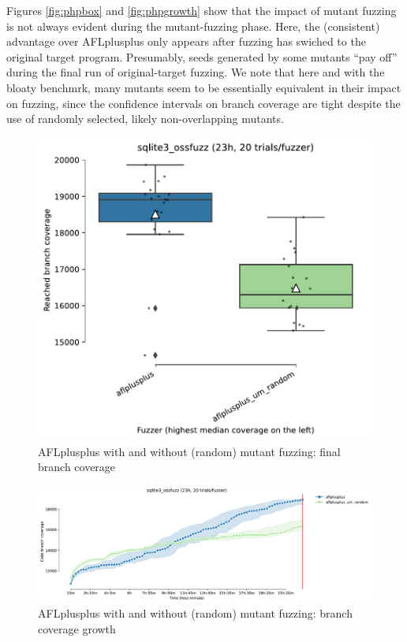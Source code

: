Figures \ref{fig:phpbox} and \ref{fig:phpgrowth} show that the impact of mutant fuzzing is not always evident during the mutant-fuzzing phase.  Here, the (consistent) advantage over AFLplusplus only appears after fuzzing has swiched to the original target program.  Presumably, seeds generated by some mutants ``pay off'' during the final run of original-target fuzzing.  We note that here and with the bloaty benchmrk, many mutants seem to be essentially equivalent in their impact on fuzzing, since the confidence intervals on branch coverage are tight despite the use of randomly selected, likely non-overlapping mutants.

\begin{figure}
  \includegraphics[width=0.75\columnwidth]{sqlite3_ossfuzz_boxplot.pdf}
  \caption{AFLplusplus with and without (random) mutant fuzzing: final branch coverage}
  \label{fig:sqlitebox}
  
\end{figure}

\begin{figure}
  \includegraphics[width=0.75\columnwidth]{sqlite3_ossfuzz_coverage_growth.pdf}
  \caption{AFLplusplus with and without (random) mutant fuzzing: branch coverage growth}
  \label{fig:sqlitegrowth}  
\end{figure}

